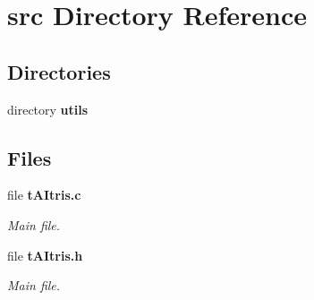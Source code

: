 \section{src Directory Reference}
\label{dir_68267d1309a1af8e8297ef4c3efbcdba}
\subsection*{Directories}
\begin{DoxyCompactItemize}
\item 
directory \textbf{ utils}
\end{DoxyCompactItemize}
\subsection*{Files}
\begin{DoxyCompactItemize}
\item 
file \textbf{ t\+A\+Itris.\+c}
\begin{DoxyCompactList}\small\item\em Main file. \end{DoxyCompactList}\item 
file \textbf{ t\+A\+Itris.\+h}
\begin{DoxyCompactList}\small\item\em Main file. \end{DoxyCompactList}\end{DoxyCompactItemize}
